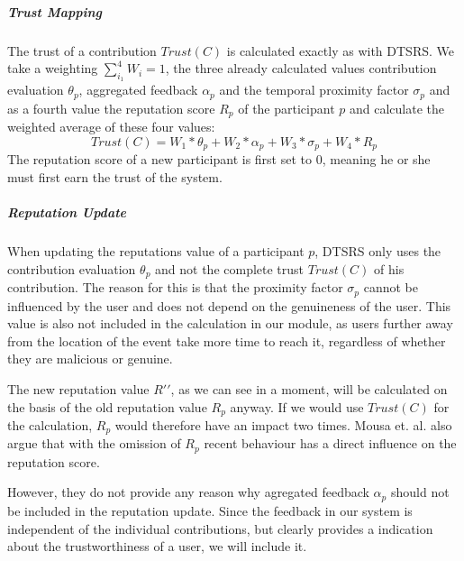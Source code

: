 \documentclass[
a4paper,     %
titlepage,   %
14pt         %
]{scrartcl}  %
\theoremstyle{mystyle}
\begin{document}
\subparagraph{Trust Mapping} The trust of a contribution $Trust(C)$ is calculated exactly as with DTSRS. We take a weighting $\sum_{i_1}^{4} W_i = 1$, the three already calculated values contribution evaluation $\theta_p$, aggregated feedback $\alpha_p$ and the temporal proximity factor $\sigma_p$ and as a fourth value the reputation score $R_p$ of the participant $p$ and calculate the weighted average of these four values:
\begin{equation}
  Trust(C) = W_1 * \theta_p +W_2 *  \alpha_p +W_3 *  \sigma_p +W_4 *  R_p
\end{equation}
The reputation score of a new participant is first set to 0, meaning he or she must first earn the trust of the system.

\subparagraph{Reputation Update} When updating the reputations value of a participant $p$, DTSRS only uses the contribution evaluation $\theta_p$ and not the complete trust $Trust(C)$ of his contribution. The reason for this is that the proximity factor $\sigma_p$ cannot be influenced by the user and does not depend on the genuineness of the user. This value is also not included in the calculation in our module, as users further away from the location of the event take more time to reach it, regardless of whether they are malicious or genuine.

The new reputation value $R\prime\prime$, as we can see in a moment, will be calculated on the basis of the old reputation value $R_p$ anyway. If we would use $Trust(C)$ for the calculation, $R_p$ would therefore have an impact two times. Mousa et. al. also argue that with the omission of $R_p$ recent behaviour has a direct influence on the reputation score.

However, they do not provide any reason why agregated feedback $\alpha_p$ should not be included in the reputation update. Since the feedback in our system is independent of the individual contributions, but clearly provides a indication about the trustworthiness of a user, we will include it.\\
\end{document}
